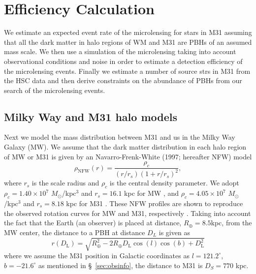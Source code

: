 \documentclass[iop, apj]{emulateapj}
\newcommand{\?}{\stackrel{?}{=}}
\begin{document}
\section{Efficiency Calculation}
We estimate an expected event rate of the microlensing for stars in M31 assuming that all the dark matter in halo regions of WM and M31 are PBHs of an assumed mass scale. 
We then use a simulation of the microlensing taking into account observational conditions and noise in order to estimate a detection efficiency of the microlensing events. 
Finally we estimate a number of source strs in M31 from the HSC data and then derive constraints on the abundance of PBHs from our search of the microlensing events. 

\subsection{Milky Way and M31 halo models}
Next we model the mass distribution between M31 and us in the Milky Way Galaxy (MW). We assume that the dark matter distribution in each halo region of MW or M31 is given by an Navarro-Frenk-White (1997; hereafter NFW) model
%
\begin{equation}
\rho_\mathrm{NFW}(r)= \frac{\rho_{c}}{(r/r_{s})(1+r/r_{s})^2},
\label{eq:rho_nfwm}
\end{equation}
%
where $r_s$ is the scale radius and $\rho_c$ is the central density parameter. We adopt $\rho_{c}=1.40\times10^7$ $M_\odot$/kpc$^3$ and $r_s=16.1$ kpc for MW \citep{NestiSalucci:13}, and $\rho_{c}=4.05\times10^7$ $M_\odot$/kpc$^3$ and $r_s=8.18$ kpc for M31 \citep{Geehanetal:06}. These NFW profiles are shown to reproduce the observed rotation curves for MW and M31, respectively \citep{Klypinetal:02}. Taking into account the fact that the Earth (an observer) is placed at distance, $R_\oplus=8.5$kpc, from the MW center, the distance to a PBH at distance $D_L$ is given as 
%
\begin{equation}
r(D_\mathrm{L})=\sqrt{R_\oplus^2-2R_\oplus D_\mathrm{L}\cos(l)\cos(b)+D^2_\mathrm{L}}
\label{eq:dislens}
\end{equation}
%
where we assume the M31 position in Galactic coordinates as $l = 121.2^{\circ}$, $b = -21.6^{\circ}$ as mentioned in \S~\ref{sec:obsinfo}, the distance to M31 is $D_S=770$ kpc. 
\end{document}
